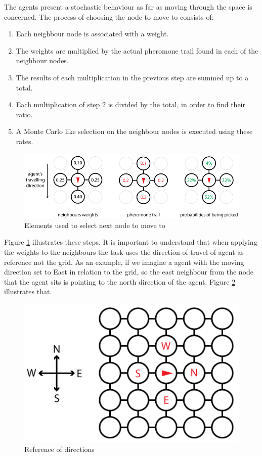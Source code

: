 The agents present a stochastic behaviour as far as moving through the space is concerned. The process of choosing the node to move to consists of: 

\begin{enumerate}
  \item Each neighbour node is associated with a weight.
  \item The weights are multiplied by the actual pheromone trail found in  each of the neighbour nodes.
  \item The results of each multiplication in the previous step are summed up to a total.
  \item Each multiplication of step 2 is divided by the total, in order to find their ratio.
  \item A Monte Carlo like selection on the neighbour nodes is executed using these rates.
\end{enumerate}

\begin{figure}[H]
  \centering
  \includegraphics[width=0.9\linewidth]{gfx/choosing-next-node.png}
  \caption{Elements used to select next node to move to}
  \label{fig:choosing-next-node}
\end{figure}

Figure \ref{fig:choosing-next-node} illustrates these steps. It is important to understand that when applying the weights to the neighbours the task uses the direction of travel of agent as reference not the grid. As an example, if we imagine a agent with the moving direction set to East in relation to the grid, so the east neighbour from the node that the agent sits is pointing to the north direction of the agent. Figure \ref{fig:position-reference} illustrates that.

\begin{figure}[H]
  \centering
  \includegraphics[width=0.5\linewidth]{gfx/reference.png}
  \caption{Reference of directions}
  \label{fig:position-reference}
\end{figure}

